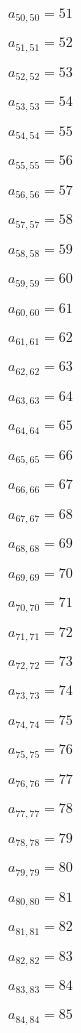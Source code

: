 \documentclass[a4paper,12pt]{article}
\begin{document}
$a _{ 50, 50 } = 51$

$a _{ 51, 51 } = 52$

$a _{ 52, 52 } = 53$

$a _{ 53, 53 } = 54$

$a _{ 54, 54 } = 55$

$a _{ 55, 55 } = 56$

$a _{ 56, 56 } = 57$

$a _{ 57, 57 } = 58$

$a _{ 58, 58 } = 59$

$a _{ 59, 59 } = 60$

$a _{ 60, 60 } = 61$

$a _{ 61, 61 } = 62$

$a _{ 62, 62 } = 63$

$a _{ 63, 63 } = 64$

$a _{ 64, 64 } = 65$

$a _{ 65, 65 } = 66$

$a _{ 66, 66 } = 67$

$a _{ 67, 67 } = 68$

$a _{ 68, 68 } = 69$

$a _{ 69, 69 } = 70$

$a _{ 70, 70 } = 71$

$a _{ 71, 71 } = 72$

$a _{ 72, 72 } = 73$

$a _{ 73, 73 } = 74$

$a _{ 74, 74 } = 75$

$a _{ 75, 75 } = 76$

$a _{ 76, 76 } = 77$

$a _{ 77, 77 } = 78$

$a _{ 78, 78 } = 79$

$a _{ 79, 79 } = 80$

$a _{ 80, 80 } = 81$

$a _{ 81, 81 } = 82$

$a _{ 82, 82 } = 83$

$a _{ 83, 83 } = 84$

$a _{ 84, 84 } = 85$
\end{document}
